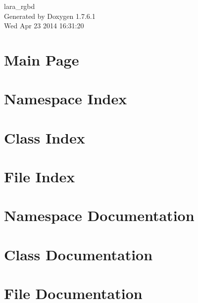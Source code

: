 \documentclass[a4paper]{book}
\begin{document}
\begin{titlepage}
\vspace*{7cm}
\begin{center}
{\Large lara\-\_\-rgbd }\\
\vspace*{1cm}
{\large \-Generated by Doxygen 1.7.6.1}\\
\vspace*{0.5cm}
{\small Wed Apr 23 2014 16:31:20}\\
\end{center}
\end{titlepage}
\clearemptydoublepage
{}
\tableofcontents
\clearemptydoublepage
{}
\chapter{\-Main \-Page}
\label{index}
\chapter{\-Namespace \-Index}

\chapter{\-Class \-Index}

\chapter{\-File \-Index}

\chapter{\-Namespace \-Documentation}








\chapter{\-Class \-Documentation}

\chapter{\-File \-Documentation}













\printindex
\end{document}

